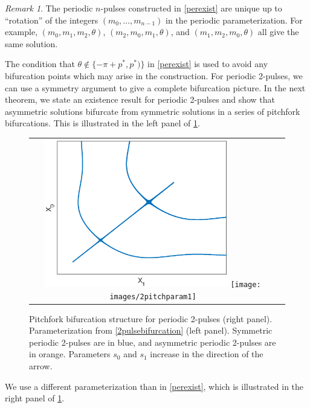 \documentclass[11pt,reqno]{amsart}
\theoremstyle{plain}
\theoremstyle{definition}
\theoremstyle{remark}
\newtheorem{remark}[theorem]{Remark}
\begin{document}
\begin{remark}\label{remark:cyclicperm}
The periodic $n$-pulses constructed in \cref{perexist} are unique up to ``rotation'' of the integers $(m_0, \dots, m_{n-1})$ in the periodic parameterization. For example, $(m_0, m_1, m_2, \theta)$, $(m_2, m_0, m_1, \theta)$, and $(m_1, m_2, m_0, \theta)$ all give the same solution.
\end{remark}

The condition that $\theta \notin \{-\pi + p^*, p^*) \}$ in \cref{perexist} is used to avoid any bifurcation points which may arise in the construction. For periodic 2-pulses, we can use a symmetry argument to give a complete bifurcation picture. In the next theorem, we state an existence result for periodic 2-pulses and show that asymmetric solutions bifurcate from symmetric solutions in a series of pitchfork bifurcations. This is illustrated in the left panel of \cref{fig:2pitch}. 
\begin{figure}
\begin{center}
\begin{tabular}{cc}
\includegraphics[width=8cm]{images/2pitchfork.eps}
\texttt{[image: images/2pitchparam1]}
\end{tabular}
\end{center}
\caption[Pitchfork bifurcation structure for periodic 2-pulses]{Pitchfork bifurcation structure for periodic 2-pulses (right panel). Parameterization from \cref{2pulsebifurcation} (left panel). Symmetric periodic 2-pulses are in blue, and asymmetric periodic 2-pulses are in orange. Parameters $s_0$ and $s_1$ increase in the direction of the arrow.}
\label{fig:2pitch}
\end{figure} 
We use a different parameterization than in \cref{perexist}, which is illustrated in the right panel of \cref{fig:2pitch}.
\end{document}
